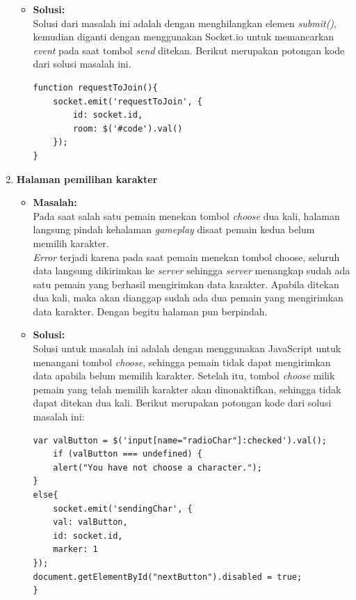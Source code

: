 \begin{enumerate}
\begin{itemize}
		\item \textbf{Solusi:} \\
		Solusi dari masalah ini adalah dengan menghilangkan elemen \textit{submit()}, kemudian diganti dengan menggunakan Socket.io untuk memancarkan \textit{event} pada saat tombol \textit{send} ditekan. Berikut merupakan potongan kode dari solusi masalah ini.
		
\begin{lstlisting}[caption={Proses memancarkan \textit{event}}, label={lst:emitEvent},captionpos=b]
function requestToJoin(){
	socket.emit('requestToJoin', {
		id: socket.id,
		room: $('#code').val()
	});
}
\end{lstlisting}	
	\end{itemize}
	
	\item \textbf{Halaman pemilihan karakter}
	\begin{itemize}
		\item \textbf{Masalah:} \\
		Pada saat salah satu pemain menekan tombol \textit{choose} dua kali, halaman langsung pindah kehalaman \textit{gameplay} disaat pemain kedua belum memilih karakter. \\
		
		\textit{Error} terjadi karena pada saat pemain menekan tombol choose, seluruh data langsung dikirimkan ke \textit{server} sehingga \textit{server} menangkap sudah ada satu pemain yang berhasil mengirimkan data karakter. Apabila ditekan dua kali, maka akan dianggap sudah ada dua pemain yang mengirimkan data karakter. Dengan begitu halaman pun berpindah.
		
		\item \textbf{Solusi:} \\
		Solusi untuk masalah ini adalah dengan menggunakan JavaScript untuk menangani tombol \textit{choose}, sehingga pemain tidak dapat mengirimkan data apabila belum memilih karakter. Setelah itu, tombol \textit{choose}  milik pemain yang telah memilih karakter akan dinonaktifkan, sehingga tidak dapat ditekan dua kali. Berikut merupakan potongan kode dari solusi masalah ini:
		
\begin{lstlisting}[caption={Proses menangani tombol \textit{choose}}, label={lst:tombolChoose},captionpos=b]
var valButton = $('input[name="radioChar"]:checked').val();
	if (valButton === undefined) {
	alert("You have not choose a character.");
}
else{
	socket.emit('sendingChar', {
	val: valButton,
	id: socket.id,
	marker: 1
});
document.getElementById("nextButton").disabled = true;
}
\end{lstlisting}
	\end{itemize}


\end{enumerate}
